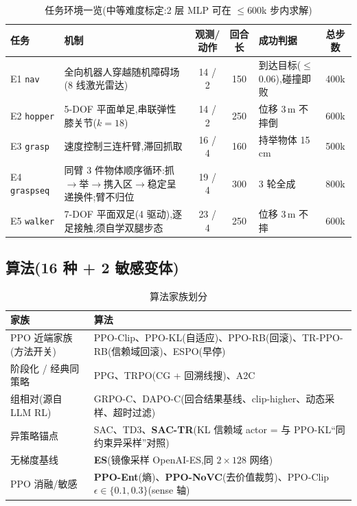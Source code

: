 \documentclass[11pt,a4paper]{ctexart}
\begin{document}
\begin{table}[H]
\centering
\caption{任务环境一览(中等难度标定:2 层 MLP 可在 $\le$600k 步内求解)}
\small
\begin{tabular}{l p{4.5cm} c c p{3.1cm} c}
\toprule
任务 & 机制 & 观测/动作 & 回合长 & 成功判据 & 总步数 \\
\midrule
E1 \texttt{nav} & 全向机器人穿越随机障碍场(8 线激光雷达) & 14 / 2 & 150 & 到达目标($\le$0.06),碰撞即败 & 400k \\
E2 \texttt{hopper} & 5-DOF 平面单足,串联弹性膝关节($k{=}18$) & 14 / 2 & 250 & 位移 3\,m 不摔倒 & 600k \\
E3 \texttt{grasp} & 速度控制三连杆臂,滞回抓取 & 16 / 4 & 160 & 持举物体 15\,cm & 500k \\
E4 \texttt{graspseq} & 同臂 3 件物体顺序循环:抓$\to$举$\to$携入区$\to$稳定呈递换件;臂不归位 & 19 / 4 & 300 & 3 轮全成 & 800k \\
E5 \texttt{walker} & 7-DOF 平面双足(4 驱动),逐足接触,须自学双腿步态 & 23 / 4 & 250 & 位移 3\,m 不摔 & 600k \\
\bottomrule
\end{tabular}
\end{table}

\subsection{算法(16 种 + 2 敏感变体)}

\begin{table}[H]
\centering
\caption{算法家族划分}
\begin{tabular}{l p{10.8cm}}
\toprule
家族 & 算法 \\
\midrule
PPO 近端家族(方法开关) & PPO-Clip、PPO-KL(自适应)、PPO-RB(回滚)、TR-PPO-RB(信赖域回滚)、ESPO(早停) \\
阶段化 / 经典同策略 & PPG、TRPO(CG + 回溯线搜)、A2C \\
组相对(源自 LLM RL) & GRPO-C、DAPO-C(回合结果基线、clip-higher、动态采样、超时过滤) \\
异策略锚点 & SAC、TD3、\textbf{SAC-TR}(KL 信赖域 actor = 与 PPO-KL``同约束异采样''对照) \\
无梯度基线 & \textbf{ES}(镜像采样 OpenAI-ES,同 $2\times128$ 网络) \\
PPO 消融/敏感 & \textbf{PPO-Ent}(熵)、\textbf{PPO-NoVC}(去价值裁剪)、PPO-Clip $\epsilon\in\{0.1,0.3\}$(sense 轴) \\
\bottomrule
\end{tabular}
\end{table}
\end{document}
